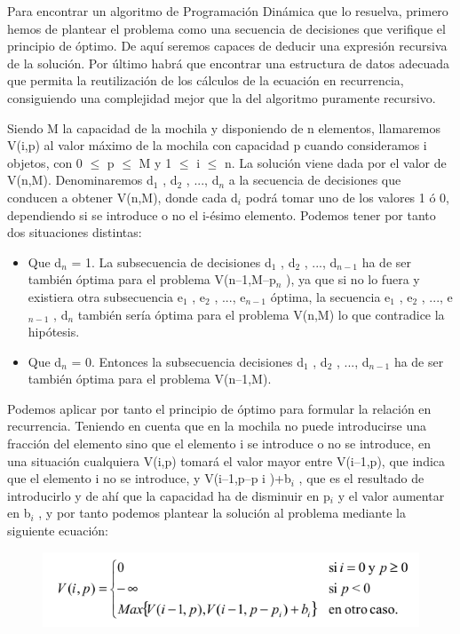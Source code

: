 Para encontrar un algoritmo de Programación Dinámica que lo resuelva, primero hemos de plantear el problema como una secuencia de decisiones que verifique el
principio de óptimo. De aquí seremos capaces de deducir una expresión recursiva de la solución. Por último habrá que encontrar una estructura de datos adecuada
que permita la reutilización de los cálculos de la ecuación en recurrencia, consiguiendo una complejidad mejor que la del algoritmo puramente recursivo.

Siendo M la capacidad de la mochila y disponiendo de n elementos, llamaremos V(i,p) al valor máximo de la mochila con capacidad p cuando consideramos i
objetos, con 0 $\leq$ p $\leq$ M y 1 $\leq$ i $\leq$ n. La solución viene dada por el valor de V(n,M). Denominaremos d$_{ 1}$ , d$_{ 2}$ , ..., d$_{ n}$ a la secuencia de decisiones que conducen a obtener V(n,M), donde cada d$_{ i}$ podrá tomar uno de los valores 1 ó 0, dependiendo si se introduce o no el i-ésimo elemento. Podemos tener por tanto dos situaciones distintas:

\begin{itemize}
	\item Que d$_{ n}$ = 1. La subsecuencia de decisiones d$_{ 1}$ , d$_{ 2}$ , ..., d$_{ n-1}$ ha de ser también
	óptima para el problema V(n–1,M–p$_{ n}$ ), ya que si no lo fuera y existiera otra subsecuencia e$_{ 1}$ , e$_{ 2}$ , ..., e$_{n-1}$ óptima, la secuencia e$_{ 1}$ , e$_{ 2}$ , ..., e$_{n-1}$ , d$_{n}$ también sería óptima para el problema V(n,M) lo que contradice la hipótesis.
	\item Que d$_{ n}$ = 0. Entonces la subsecuencia decisiones d$_{ 1}$ , d$_{ 2}$ , ..., d$_{ n-1}$ ha de ser también
	óptima para el problema V(n–1,M).
\end{itemize}

Podemos aplicar por tanto el principio de óptimo para formular la relación en recurrencia. Teniendo en cuenta que en la mochila no puede introducirse una fracción del elemento sino que el elemento i se introduce o no se introduce, en una situación cualquiera V(i,p) tomará el valor mayor entre V(i–1,p), que indica que el elemento i no se introduce, y V(i–1,p–p i )+b$_{ i}$ , que es el resultado de introducirlo y de ahí que la capacidad ha de disminuir en p$_{ i}$ y el valor aumentar en b$_{ i}$ , y por tanto podemos plantear la solución al problema mediante la siguiente ecuación:

\begin{figure}[h]
	\centering 
	\includegraphics[scale=0.73]{img/mochila01_1}
	\label{contexto:figura5}
\end{figure}